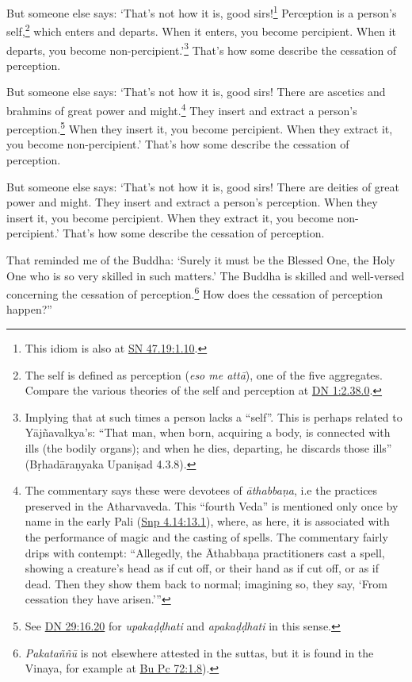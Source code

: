 \documentclass[12pt,openany]{book}%
\begin{document}
But someone else says: ‘That’s not how it is, good sirs!\footnote{This idiom is also at \href{https://suttacentral.net/sn47.19/en/sujato\#1.10}{SN 47.19:1.10}. } Perception is a person’s self,\footnote{The self is defined as perception (\textit{eso me \textsanskrit{attā}}), one of the five aggregates. Compare the various theories of the self and perception at \href{https://suttacentral.net/dn1/en/sujato\#2.38.0}{DN 1:2.38.0}. } which enters and departs. When it enters, you become percipient. When it departs, you become non-percipient.’\footnote{Implying that at such times a person lacks a “self”. This is perhaps related to \textsanskrit{Yājñavalkya}’s: “That man, when born, acquiring a body, is connected with ills (the bodily organs); and when he dies, departing, he discards those ills” (\textsanskrit{Bṛhadāraṇyaka} \textsanskrit{Upaniṣad} 4.3.8). } That’s how some describe the cessation of perception. 

But someone else says: ‘That’s not how it is, good sirs! There are ascetics and brahmins of great power and might.\footnote{The commentary says these were devotees of \textit{\textsanskrit{āthabbaṇa}}, i.e the practices preserved in the Atharvaveda. This “fourth Veda” is mentioned only once by name in the early Pali (\href{https://suttacentral.net/snp4.14/en/sujato\#13.1}{Snp 4.14:13.1}), where, as here, it is associated with the performance of magic and the casting of spells. The commentary fairly drips with contempt: “Allegedly, the \textsanskrit{Āthabbaṇa} practitioners cast a spell, showing a creature’s head as if cut off, or their hand as if cut off, or as if dead. Then they show them back to normal; imagining so, they say, ‘From cessation they have arisen.’” } They insert and extract a person’s perception.\footnote{See \href{https://suttacentral.net/dn29/en/sujato\#16.20}{DN 29:16.20} for \textit{\textsanskrit{upakaḍḍhati}} and \textit{\textsanskrit{apakaḍḍhati}} in this sense. } When they insert it, you become percipient. When they extract it, you become non-percipient.’ That’s how some describe the cessation of perception. 

But someone else says: ‘That’s not how it is, good sirs! There are deities of great power and might. They insert and extract a person’s perception. When they insert it, you become percipient. When they extract it, you become non-percipient.’ That’s how some describe the cessation of perception. 

That reminded me of the Buddha: ‘Surely it must be the Blessed One, the Holy One who is so very skilled in such matters.’ The Buddha is skilled and well-versed concerning the cessation of perception.\footnote{\textit{\textsanskrit{Pakataññū}} is not elsewhere attested in the suttas, but it is found in the Vinaya, for example at \href{https://suttacentral.net/pli-tv-bu-vb-pc72/en/sujato\#1.8}{Bu Pc 72:1.8}). } How does the cessation of perception happen?” 
\end{document}
